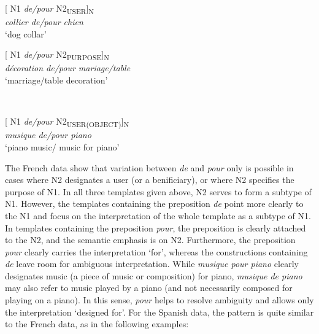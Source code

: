 \documentclass[output=paper]{langsci/langscibook}
\begin{document}
\begin{minipage}{0.4\textwidth}    %
[ N1 \textit{de/pour} N2\textsubscript{USER}]\textsubscript{N}\\
\textit{collier de/pour chien}\\
`dog collar'
\end{minipage}
\hfill            %
\begin{minipage}{0.4\textwidth}
[ N1 \textit{de/pour} N2\textsubscript{PURPOSE}]\textsubscript{N}\\
\textit{décoration de/pour mariage/table}\\
`marriage/table decoration'
\end{minipage} \\
\hfill  
\vspace{0.5cm}

\begin{minipage}{0.4\textwidth}    %
[ N1 \textit{de/pour} N2\textsubscript{USER(OBJECT)}]\textsubscript{N}\\
\textit{musique de/pour piano}\\
`piano music/ music for piano'
\end{minipage}
\hfill  
\vspace{0.5cm}      

The French data show that variation between \textit{de} and \textit{pour} only is possible in cases where N2 designates a user (or a benificiary), or where N2 specifies the purpose of N1. In all three templates given above, N2 serves to form a subtype of N1. However, the templates containing the preposition \textit{de} point more clearly to the N1 and focus on the interpretation of the whole template as a subtype of N1. In templates containing the preposition \textit{pour}, the preposition is clearly attached to the N2, and the semantic emphasis is on N2. Furthermore, the preposition \textit{pour} clearly carries the interpretation `for', whereas the constructions containing \textit{de} leave room for ambiguous interpretation. While \textit{musique pour piano} clearly designates music (a piece of music or composition) for piano, \textit{musique de piano} may also refer to music played by a piano (and not necessarily composed for playing on a piano). In this sense, \textit{pour} helps to resolve ambiguity and allows only the interpretation `designed for'. For the Spanish data, the pattern is quite similar to the French data, as in the following examples: 
 
\end{document}
